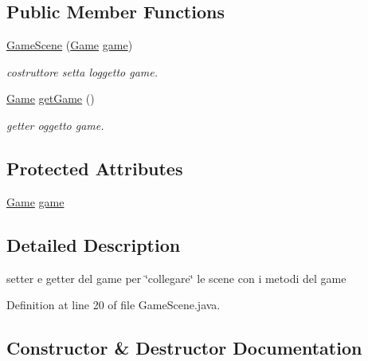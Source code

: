 \subsection*{Public Member Functions}
\begin{DoxyCompactItemize}
\item 
\hyperlink{classscenes_1_1_game_scene_a6babef5c76068a18010ea5524d8c5e7d}{Game\+Scene} (\hyperlink{classprogetto_1_1_game}{Game} \hyperlink{classscenes_1_1_game_scene_ac6a5ed6191fcf3a5bf0445921feb4f48}{game})
\begin{DoxyCompactList}\small\item\em costruttore setta l\textquotesingle{}oggetto game. \end{DoxyCompactList}\item 
\hyperlink{classprogetto_1_1_game}{Game} \hyperlink{classscenes_1_1_game_scene_af764ff126134eee0117e7e212faee455}{get\+Game} ()
\begin{DoxyCompactList}\small\item\em getter oggetto game. \end{DoxyCompactList}\end{DoxyCompactItemize}
\subsection*{Protected Attributes}
\begin{DoxyCompactItemize}
\item 
\hyperlink{classprogetto_1_1_game}{Game} \hyperlink{classscenes_1_1_game_scene_ac6a5ed6191fcf3a5bf0445921feb4f48}{game}
\end{DoxyCompactItemize}


\subsection{Detailed Description}
setter e getter del game per \char`\"{}collegare\char`\"{} le scene con i metodi del game 

Definition at line 20 of file Game\+Scene.\+java.



\subsection{Constructor \& Destructor Documentation}
\mbox{\label{classscenes_1_1_game_scene_a6babef5c76068a18010ea5524d8c5e7d}} 
